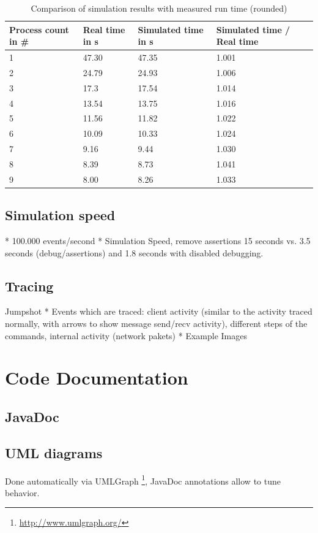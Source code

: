 \documentclass[
     11pt,         %
     a4paper,      %
     BCOR10mm,     %
     DIV14,        %
     liststotoc,   %
     bibtotoc,     %
     idxtotoc,     %
     parskip       %
     ]{scrreprt}   %
\begin{document}
\begin{table}
\begin{center}
\begin{tabular}{l||l|l|l}
Process count in \# & Real time in s & Simulated time in s & Simulated time / Real time \\
\hline
\hline
1 & 47.30 & 47.35 & 1.001 \\
2 & 24.79 & 24.93 & 1.006 \\
3 & 17.3 & 17.54 & 1.014 \\
4 & 13.54 & 13.75 & 1.016 \\
5 & 11.56 & 11.82 & 1.022 \\
6 & 10.09 & 10.33 & 1.024 \\
7 & 9.16 & 9.44 & 1.030 \\
8 & 8.39 & 8.73 & 1.041 \\
9 & 8.00 & 8.26 & 1.033
\end{tabular}
\end{center}
\caption{Comparison of simulation results with measured run time (rounded)}
\label{tbl:pde_results}
\end{table}


\subsection{Simulation speed}
* 100.000 events/second
* Simulation Speed, remove assertions 15 seconds vs. 3.5 seconds (debug/assertions) and 1.8 seconds with disabled debugging.

\subsection{Tracing}
Jumpshot
* Events which are traced: client activity (similar to the activity traced normally, with arrows to show message send/recv activity), different steps of the  commands, internal activity (network pakets)
* Example Images

\section{Code Documentation}
\subsection{JavaDoc}

\subsection{UML diagrams}
Done automatically via UMLGraph \footnote{\url{http://www.umlgraph.org/}}, JavaDoc annotations
allow to tune behavior.
\end{document}

